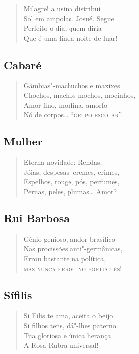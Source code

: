 \begin{verse}
Milagre! a usina distribui\\
Sol em ampolas. Josué. Segue\\
Perfeito o dia, quem diria\\
Que é uma linda noite de luar!
\end{verse}


\medskip
\subsection*{Cabaré}

\begin{verse}
Gâmbias"-machuchos e maxixes\\
Chochos, machos mochos, mocinhos,\\
Amor fino, morfina, amorfo\\
Nó de corpos\ldots{} ``\textsc{grupo escolar}''.
\end{verse}

\medskip
\subsection*{Mulher}

\begin{verse}
Eterna novidade: Rendas.\\
Jóias, despesas, cremes, crimes,\\
Espelhos, rouge, pós, perfumes,\\
Pernas, peles, plumas\ldots{} Amor?
\end{verse}

\medskip
\subsection*{Rui Barbosa}

\begin{verse}
Gênio genioso, andor brasílico\\
Nas procissões anti"-germânicas,\\
Errou bastante na política,\\
\textsc{mas nunca errou no português!}
\end{verse}

\medskip
\subsection*{Sífilis}

\begin{verse}
Si Filis te ama, aceita o beijo\\
Si filhos tens, dá"-lhes paterno\\
Tua gloriosa e única herança\\
A Rosa Rubra universal!
\end{verse}

